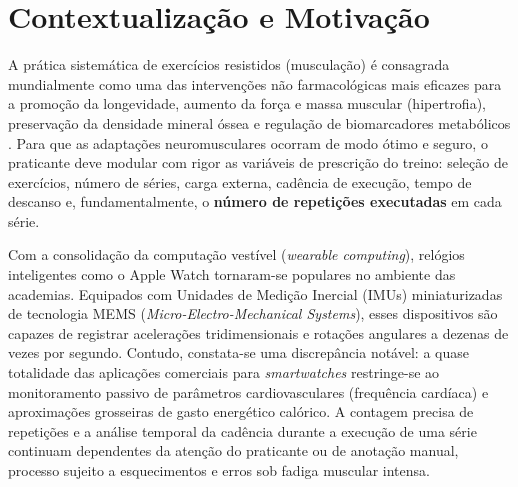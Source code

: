 \documentclass[12pt,openany,oneside,a4paper,english,brazil]{abntex2}
\begin{document}
\section{Contextualização e Motivação}
A prática sistemática de exercícios resistidos (musculação) é consagrada mundialmente como uma das intervenções não farmacológicas mais eficazes para a promoção da longevidade, aumento da força e massa muscular (hipertrofia), preservação da densidade mineral óssea e regulação de biomarcadores metabólicos \cite{acsm2018}. Para que as adaptações neuromusculares ocorram de modo ótimo e seguro, o praticante deve modular com rigor as variáveis de prescrição do treino: seleção de exercícios, número de séries, carga externa, cadência de execução, tempo de descanso e, fundamentalmente, o \textbf{número de repetições executadas} em cada série.

Com a consolidação da computação vestível (\textit{wearable computing}), relógios inteligentes como o Apple Watch tornaram-se populares no ambiente das academias. Equipados com Unidades de Medição Inercial (IMUs) miniaturizadas de tecnologia MEMS (\textit{Micro-Electro-Mechanical Systems}), esses dispositivos são capazes de registrar acelerações tridimensionais e rotações angulares a dezenas de vezes por segundo. Contudo, constata-se uma discrepância notável: a quase totalidade das aplicações comerciais para \textit{smartwatches} restringe-se ao monitoramento passivo de parâmetros cardiovasculares (frequência cardíaca) e aproximações grosseiras de gasto energético calórico. A contagem precisa de repetições e a análise temporal da cadência durante a execução de uma série continuam dependentes da atenção do praticante ou de anotação manual, processo sujeito a esquecimentos e erros sob fadiga muscular intensa.
\end{document}
